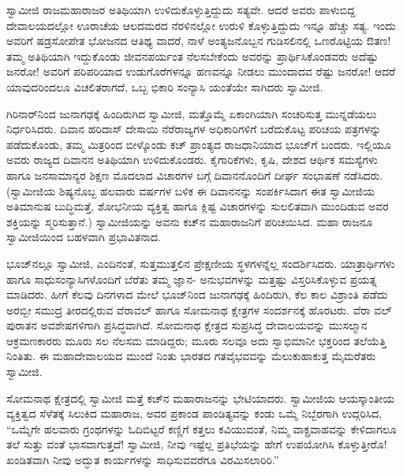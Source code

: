 ಸ್ವಾಮೀಜಿ ರಾಜಮಹಾರಾಜರ ಅತಿಥಿಯಾಗಿ ಉಳಿದುಕೊಳ್ಳುತ್ತಿದ್ದುದು ಸತ್ಯವೇ. ಆದರೆ ಅವರು ಪಾಳುಬಿದ್ದ ದೇವಾಲಯದಲ್ಲೋ ಊರಾಚೆಯ ಆಲದಮರದ ನೆರಳಿನಲ್ಲೋ ಉರುಳಿ ಕೊಳ್ಳುತ್ತಿದ್ದುದು ಇನ್ನೂ ಹೆಚ್ಚು ಸತ್ಯ. ಇಂದು ಅವರಿಗೆ ಷಡ್ರಸೋಪೇತ ಭೋಜನದ ಆತಿಥ್ಯ ವಾದರೆ, ನಾಳೆ ಅಂತ್ಯಜನೊಬ್ಬನ ಗುಡಿಸಲಿನಲ್ಲಿ ಒಣರೊಟ್ಟಿಯ ಔತಣ! ತಮ್ಮ ಅತಿಥಿಯಾಗಿ ಇದ್ದುಕೊಂಡು ಜೀವನಪರ್ಯಂತ ನೆಲಸಬೇಕೆಂದು ಅವರನ್ನು ಪ್ರಾರ್ಥಿಸಿಕೊಂಡವರು ಅದೆಷ್ಟು ಜನರೋ! ಅವರಿಗೆ ಪರಿಪರಿಯಾದ ಉಡುಗೊರೆಗಳನ್ನೂ ಹಣವನ್ನೂ ನೀಡಲು ಮುಂದಾದವ ರೆಷ್ಟು ಜನರೋ! ಆದರೆ ಯಾವುದರಿಂದಲೂ ವಿಚಲಿತರಾಗದೆ, ಒಬ್ಬ ಭಿಕಾರಿ ಸಂನ್ಯಾಸಿ ಯಂತೆಯೇ ಸಾಗಿದರು ಸ್ವಾಮೀಜಿ.

ಗಿರಿನಾರ್​ನಿಂದ ಜುನಾಗಢಕ್ಕೆ ಹಿಂದಿರುಗಿದ ಸ್ವಾಮೀಜಿ, ಮತ್ತೊಮ್ಮೆ ಏಕಾಂಗಿಯಾಗಿ ಸಂಚರಿಸುತ್ತ ಮುನ್ನಡೆಯಲು ನಿರ್ಧರಿಸಿದರು. ದಿವಾನ ಹರಿದಾಸ್ ದೇಸಾಯಿ ನೆರೆರಾಜ್ಯಗಳ ಅಧಿಕಾರಿಗಳಿಗೆ ಬರೆದುಕೊಟ್ಟ ಪರಿಚಯ ಪತ್ರಗಳನ್ನು ಪಡೆದುಕೊಂಡು, ತಮ್ಮ ಮಿತ್ರರಿಂದ ಬೀಳ್ಕೊಂಡು ಕಚ್ ಪ್ರಾಂತ್ಯದ ರಾಜಧಾನಿಯಾದ ಭೂಜ್​ಗೆ ಬಂದರು. ಇಲ್ಲಿಯೂ ಅವರು ರಾಜ್ಯದ ದಿವಾನನ ಅತಿಥಿಯಾಗಿ ಉಳಿದುಕೊಂಡರು. ಕೈಗಾರಿಕೆಗಳು, ಕೃಷಿ, ದೇಶದ ಆರ್ಥಿಕ ಸಮಸ್ಯೆಗಳು ಹಾಗೂ ಜನಸಾಮಾನ್ಯರ ಶಿಕ್ಷಣ ಮೊದಲಾದ ವಿಚಾರಗಳ ಬಗ್ಗೆ ದಿವಾನನೊಂದಿಗೆ ದೀರ್ಘ ಸಂಭಾಷಣೆ ನಡೆಸಿದರು. (ಸ್ವಾಮೀಜಿಯ ಶಿಷ್ಯನೊಬ್ಬ ಹಲವಾರು ವರ್ಷಗಳ ಬಳಿಕ ಈ ದಿವಾನನನ್ನು ಸಂಪರ್ಕಿಸಿದಾಗ ಈತ ಸ್ವಾಮೀಜಿಯ ಅತಿಮಾನುಷ ಬುದ್ಧಿಮತ್ತೆ, ಶೋಭನೀಯ ವ್ಯಕ್ತಿತ್ವ ಹಾಗೂ ಕ್ಲಿಷ್ಟ ವಿಚಾರಗಳನ್ನು ಸುಲಲಿತವಾಗಿ ಮುಂದಿಡುವ ಅವರ ಶಕ್ತಿಯನ್ನು ಸ್ಮರಿಸುತ್ತಾನೆ.) ಸ್ವಾಮೀಜಿಯನ್ನು ಅವನು ಕಚ್​ನ ಮಹಾರಾಜನಿಗೆ ಪರಿಚಯಿಸಿದ. ಮಹಾ ರಾಜನೂ ಸ್ವಾಮೀಜಿಯಿಂದ ಬಹಳವಾಗಿ ಪ್ರಭಾವಿತನಾದ.

ಭೂಜ್​ನಲ್ಲೂ ಸ್ವಾಮೀಜಿ, ಎಂದಿನಂತೆ, ಸುತ್ತಮುತ್ತಲಿನ ಪ್ರೇಕ್ಷಣೀಯ ಸ್ಥಳಗಳನ್ನೆಲ್ಲ ಸಂದರ್ಶಿಸಿದರು. ಯಾತ್ರಾರ್ಥಿಗಳು ಹಾಗೂ ಸಾಧುಸಂನ್ಯಾಸಿಗಳೊಂದಿಗೆ ಬೆರೆತು ತಮ್ಮ ಜ್ಞಾನ- ಅನುಭವಗಳನ್ನು ಮತ್ತಷ್ಟು ವಿಸ್ತರಿಸಿಕೊಳ್ಳುವ ಪ್ರಯತ್ನ ಮಾಡಿದರು. ಹೀಗೆ ಕೆಲವು ದಿನಗಳಾದ ಮೇಲೆ ಭೂಜ್​ನಿಂದ ಜುನಾಗಢಕ್ಕೆ ಹಿಂದಿರುಗಿ, ಕೆಲ ಕಾಲ ವಿಶ್ರಾಂತಿ ಪಡೆದು ಅರಬ್ಬೀ ಸಮುದ್ರ ತೀರದಲ್ಲಿರುವ ವೆರಾವಲ್ ಹಾಗೂ ಸೋಮನಾಥ ಕ್ಷೇತ್ರಗಳ ಸಂದರ್ಶನಕ್ಕೆ ಹೊರಟರು. ವೆರಾ ವಲ್ ಪುರಾತನ ಅವಶೇಷಗಳಿಗಾಗಿ ಪ್ರಸಿದ್ಧವಾಗಿದೆ. ಸೋಮನಾಥ ಕ್ಷೇತ್ರದ ಸುಪ್ರಸಿದ್ಧ ದೇವಾಲಯವನ್ನು ಮುಸಲ್ಮಾನ ಆಕ್ರಮಣಕಾರರು ಮೂರು ಸಲ ನೆಲಸಮ ಮಾಡಿದ್ದರು; ಮೂರು ಸಲವೂ ಅದು ಸ್ವಾಭಿಮಾನೀ ಭಕ್ತರಿಂದ ತಲೆಯೆತ್ತಿ ನಿಂತಿತು. ಈ ಮಹಾದೇವಾಲಯದ ಮುಂದೆ ನಿಂತು ಭಾರತದ ಗತವೈಭವವನ್ನು ಮೆಲುಕುಹಾಕುತ್ತ ಮೈಮರೆತರು ಸ್ವಾಮೀಜಿ.

ಸೋಮನಾಥ ಕ್ಷೇತ್ರದಲ್ಲಿ ಸ್ವಾಮೀಜಿ ಮತ್ತೆ ಕಚ್​ನ ಮಹಾರಾಜನನ್ನು ಭೇಟಿಯಾದರು. ಸ್ವಾಮೀಜಿಯ ಆಯಸ್ಕಾಂತೀಯ ವ್ಯಕ್ತಿತ್ವದ ಸೆಳೆತಕ್ಕೆ ಸಿಲುಕಿದ ಮಹಾರಾಜ, ಅವರ ಪ್ರಕಾಂಡ ಪಾಂಡಿತ್ಯವನ್ನು ಕಂಡು ಒಮ್ಮೆ ನಿಬ್ಬೆರಗಾಗಿ ಉದ್ಗರಿಸಿದ, “ಒಮ್ಮೆಗೇ ಹಲವಾರು ಗ್ರಂಥಗಳನ್ನು ಓದಿಬಿಟ್ಟರೆ ಕಣ್ಣಿಗೆ ಕತ್ತಲು ಕವಿಯುವಂತೆ, ನಿಮ್ಮ ವಾಕ್ಪ್ರವಾಹವನ್ನು ಕೇಳಿದಾಗಲೂ ತಲೆ ಸುತ್ತು ವಂತೆ ಭಾಸವಾಗುತ್ತದೆ! ಸ್ವಾಮೀಜಿ, ನೀವು ಇಷ್ಟೆಲ್ಲ ಪ್ರತಿಭೆಯನ್ನು ಹೇಗೆ ಉಪಯೋಗಿಸಿ ಕೊಳ್ಳುತ್ತೀರೊ! ಖಂಡಿತವಾಗಿ ನೀವು ಅದ್ಭುತ ಕಾರ್ಯಗಳನ್ನು ಸಾಧಿಸುವವರೆಗೂ ವಿರಮಿಸಲಾರಿರಿ.”

